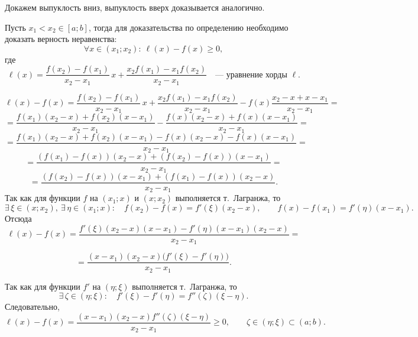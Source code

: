 \begin{Proof}
Докажем выпуклость вниз, выпуклость вверх доказывается аналогично.

Пусть $x_1<x_2\in[a;b]$, тогда для доказательства по определению необходимо
доказать верность неравенства:
\[
\forall x\in(x_1;x_2):\ \ell(x)-f(x)\ge 0,
\]
где
\[
\ell(x)=\frac{f(x_2)-f(x_1)}{x_2-x_1}\,x+\frac{x_2f(x_1)-x_1f(x_2)}{x_2-x_1}
\quad \text{— уравнение хорды } \ell.
\]

\[
\ell(x)-f(x)=\frac{f(x_2)-f(x_1)}{x_2-x_1}\,x+\frac{x_2f(x_1)-x_1f(x_2)}{x_2-x_1}
-f(x)\frac{x_2-x+x-x_1}{x_2-x_1}=
\]
\[
=\frac{f(x_1)(x_2-x)+f(x_2)(x-x_1)}{x_2-x_1}
-\frac{f(x)(x_2-x)+f(x)(x-x_1)}{x_2-x_1}=
\]
\[
=\frac{f(x_1)(x_2-x)+f(x_2)(x-x_1)-f(x)(x_2-x)-f(x)(x-x_1)}{x_2-x_1}=
\]
\[
=\frac{(f(x_1)-f(x))(x_2-x)+(f(x_2)-f(x))(x-x_1)}{x_2-x_1}=
\]
\[
=\frac{(f(x_2)-f(x))(x-x_1)+(f(x_1)-f(x))(x_2-x)}{x_2-x_1}.
\]
Так как для функции $f$ на $(x_1;x)$ и $(x;x_2)$ выполняется т.\ Лагранжа, то
\[
\exists\,\xi\in(x;x_2),\ \exists\,\eta\in(x_1;x):
\quad
f(x_2)-f(x)=f'(\xi)(x_2-x),\qquad f(x)-f(x_1)=f'(\eta)(x-x_1).
\]
Отсюда
\[
\ell(x)-f(x)=
\frac{f'(\xi)(x_2-x)(x-x_1)-f'(\eta)(x-x_1)(x_2-x)}{x_2-x_1}
=
\]

\[
= \frac{(x-x_1)(x_2-x)\bigl(f'(\xi)-f'(\eta)\bigr)}{x_2-x_1}.
\]

Так как для функции $f'$ на $(\eta;\xi)$ выполняется т.\ Лагранжа, то
\[
\exists\,\zeta\in(\eta;\xi):\quad f'(\xi)-f'(\eta)=f''(\zeta)(\xi-\eta).
\]
Следовательно,
\[
\ell(x)-f(x)=
\frac{(x-x_1)(x_2-x)f''(\zeta)(\xi-\eta)}{x_2-x_1}\ge 0,
\qquad \zeta\in(\eta;\xi)\subset(a;b).
\]
\end{Proof}
